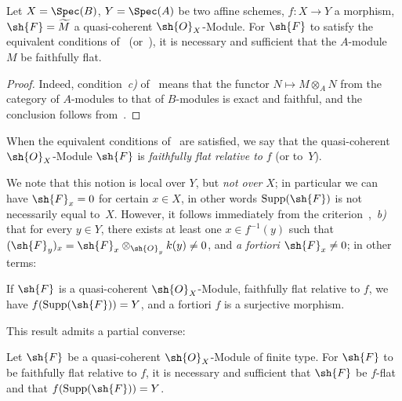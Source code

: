 \begin{corollary}[2.2.3]
\label{IV.2.2.3}
Let $X=\Spec(B)$, $Y=\Spec(A)$ be two affine schemes, $f:X\to Y$ a morphism, $\sh{F}=\widetilde{M}$ a quasi-coherent $\sh{O}_X$-Module.
For $\sh{F}$ to satisfy the equivalent conditions of~ \textnormal{(}or~\textnormal{)}, it is necessary and sufficient that the $A$-module $M$ be faithfully flat.
\end{corollary}

\begin{proof}
Indeed, condition~\emph{c)} of~ means that the functor $N\mapsto M\otimes_A N$ from the category of $A$-modules to that of $B$-modules is exact and faithful, and the conclusion follows from~.
\end{proof}

\begin{definition}[2.2.4]
\label{IV.2.2.4}
When the equivalent conditions of~ are satisfied, we say that the quasi-coherent $\sh{O}_X$-Module $\sh{F}$ is \emph{faithfully flat relative to} $f$ (or to~$Y$).
\end{definition}

We note that this notion is local over $Y$, but \emph{not over} $X$; in particular we can have $\sh{F}_x=0$ for certain $x\in X$, in other words $\operatorname{Supp}(\sh{F})$ is not necessarily equal to~$X$.
However, it follows immediately from the criterion~,~\emph{b)} that for every $y\in Y$, there exists at least one $x\in f^{-1}(y)$ such that $(\sh{F}_y)_x=\sh{F}_x\otimes_{\sh{O}_y}k(y)\neq 0$, and \emph{a fortiori} $\sh{F}_x\neq 0$; in other terms:

\begin{corollary}[2.2.5]
\label{IV.2.2.5}
If $\sh{F}$ is a quasi-coherent $\sh{O}_X$-Module, faithfully flat relative to $f$, we have $f(\operatorname{Supp}(\sh{F}))=Y$, and a fortiori $f$ is a surjective morphism.
\end{corollary}

This result admits a partial converse:

\begin{corollary}[2.2.6]
\label{IV.2.2.6}
Let $\sh{F}$ be a quasi-coherent $\sh{O}_X$-Module of finite type. For $\sh{F}$ to be faithfully flat relative to $f$, it is necessary and sufficient that $\sh{F}$ be $f$-flat and that $f(\operatorname{Supp}(\sh{F}))=Y$.
\end{corollary}

